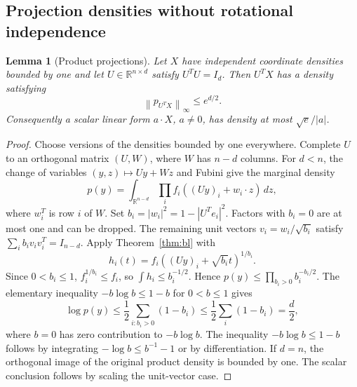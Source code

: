 \documentclass[11pt]{article}
\numberwithin{equation}{section}
\newtheorem{lemma}[theorem]{Lemma}
\theoremstyle{definition}\newtheorem{definition}[theorem]{Definition}
\theoremstyle{remark}\newtheorem{remark}[theorem]{Remark}
\newcommand{\R}{\mathbb R}\newcommand{\E}{\mathbb E}\newcommand{\PP}{\mathbb P}
\newcommand{\1}{\mathbf 1}\newcommand{\diag}{\operatorname{diag}}
\newcommand{\norm}[1]{\left\lVert#1\right\rVert}\newcommand{\abs}[1]{\left|#1\right|}
\begin{document}
\subsection{Projection densities without rotational independence}
\begin{lemma}[Product projections]\label{lem:projection}
Let $X$ have independent coordinate densities bounded by one and let $U\in\R^{n\times d}$ satisfy $U^TU=I_d$. Then $U^TX$ has a density satisfying
\begin{equation}\label{eq:projection}
 \norm{p_{U^TX}}_\infty\le e^{d/2}.
\end{equation}
Consequently a scalar linear form $a\cdot X$, $a\ne0$, has density at most $\sqrt e/|a|$.
\end{lemma}
\begin{proof}
Choose versions of the densities bounded by one everywhere. Complete $U$ to an orthogonal matrix $(U,W)$, where $W$ has $n-d$ columns. For $d<n$, the change of variables $(y,z)\mapsto Uy+Wz$ and Fubini give the marginal density
\[
 p(y)=\int_{\R^{n-d}}\prod_i f_i((Uy)_i+w_i\cdot z)\,dz,
\]
where $w_i^T$ is row $i$ of $W$. Set $b_i=|w_i|^2=1-|U^Te_i|^2$. Factors with $b_i=0$ are at most one and can be dropped. The remaining unit vectors $v_i=w_i/\sqrt{b_i}$ satisfy
$\sum_i b_i v_i v_i^T=I_{n-d}$. Apply Theorem~\ref{thm:bl} with
\[
 h_i(t)=f_i((Uy)_i+\sqrt{b_i}t)^{1/b_i}.
\]
Since $0<b_i\le1$, $f_i^{1/b_i}\le f_i$, so $\int h_i\le b_i^{-1/2}$. Hence
$p(y)\le\prod_{b_i>0} b_i^{-b_i/2}$.
The elementary inequality $-b\log b\le1-b$ for $0<b\le1$ gives
\[
 \log p(y)\le\frac12\sum_{i:b_i>0}(1-b_i)\le\frac12\sum_i(1-b_i)=\frac d2,
\]
where $b=0$ has zero contribution to $-b\log b$. The inequality $-b\log b\le1-b$ follows by integrating $-\log b\le b^{-1}-1$ or by differentiation. If $d=n$, the orthogonal image of the original product density is bounded by one. The scalar conclusion follows by scaling the unit-vector case.
\end{proof}
\end{document}

